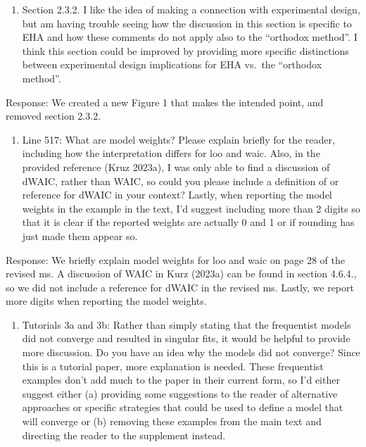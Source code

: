 \documentclass[
]{article}
\providecommand{\tightlist}{%
  \setlength{\itemsep}{0pt}\setlength{\parskip}{0pt}}
\renewenvironment{quote}{\begin{leftbar}}{\end{leftbar}}
\begin{document}
\begin{quote}
\begin{enumerate}
\def\labelenumi{\arabic{enumi}.}
\setcounter{enumi}{4}
\tightlist
\item
  Section 2.3.2. I like the idea of making a connection with
  experimental design, but am having trouble seeing how the discussion
  in this section is specific to EHA and how these comments do not apply
  also to the ``orthodox method''. I think this section could be
  improved by providing more specific distinctions between experimental
  design implications for EHA vs.~the ``orthodox method''.
\end{enumerate}
\end{quote}

Response: We created a new Figure 1 that makes the intended point, and
removed section 2.3.2.

\begin{quote}
\begin{enumerate}
\def\labelenumi{\arabic{enumi}.}
\setcounter{enumi}{5}
\tightlist
\item
  Line 517: What are model weights? Please explain briefly for the
  reader, including how the interpretation differs for loo and waic.
  Also, in the provided reference (Kruz 2023a), I was only able to find
  a discussion of dWAIC, rather than WAIC, so could you please include a
  definition of or reference for dWAIC in your context? Lastly, when
  reporting the model weights in the example in the text, I'd suggest
  including more than 2 digits so that it is clear if the reported
  weights are actually 0 and 1 or if rounding has just made them appear
  so.
\end{enumerate}
\end{quote}

Response: We briefly explain model weights for loo and waic on page 28
of the revised ms. A discussion of WAIC in Kurz (2023a) can be found in
section 4.6.4., so we did not include a reference for dWAIC in the
revised ms. Lastly, we report more digits when reporting the model
weights.

\begin{quote}
\begin{enumerate}
\def\labelenumi{\arabic{enumi}.}
\setcounter{enumi}{6}
\tightlist
\item
  Tutorials 3a and 3b: Rather than simply stating that the frequentist
  models did not converge and resulted in singular fits, it would be
  helpful to provide more discussion. Do you have an idea why the models
  did not converge? Since this is a tutorial paper, more explanation is
  needed. These frequentist examples don't add much to the paper in
  their current form, so I'd either suggest either (a) providing some
  suggestions to the reader of alternative approaches or specific
  strategies that could be used to define a model that will converge or
  (b) removing these examples from the main text and directing the
  reader to the supplement instead.
\end{enumerate}
\end{quote}
\end{document}
